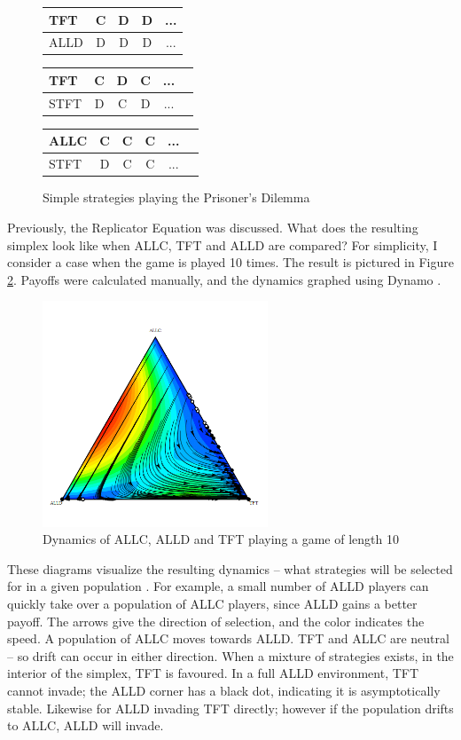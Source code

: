 \documentclass[a4paper,11pt,bcshonoursthesis,singlespace,oneside,thesisdraft,pdflatex]{cssethesis}
\begin{document}
\begin{figure}[h]
\centering
\captionsetup{justification=centering}
\begin{tabular}{|l|c|c|c|c|}
\hline
TFT & C & D & D&...\\
\hline
ALLD & D & D &D&...\\
\hline
\end{tabular}\hfill
\begin{tabular}{|l|c|c|c|c|c|}
\hline
TFT & C & D&C&...\\
\hline
STFT & D & C&D&...\\
\hline
\end{tabular}\hfill
\begin{tabular}{|l|c|c|c|c|c|}
\hline
ALLC & C & C&C&...\\
\hline
STFT & D & C&C&...\\
\hline
\end{tabular}\hfill
\caption{Simple strategies playing the Prisoner's Dilemma}
\label{table:reciprocity}
\end{figure}

Previously, the Replicator Equation was discussed. 
What does the resulting simplex look like when ALLC, TFT and ALLD are compared? 
For simplicity, I consider a case when the game is played 10 times. 
The result is pictured in Figure \ref{fig:allcalldtft}. 
Payoffs were calculated manually, and the dynamics graphed using Dynamo \citep{dynamo}.

\begin{figure}[h!]
\center
\includegraphics[width=0.6\textwidth]{allcalldtft}
\caption{Dynamics of ALLC, ALLD and TFT playing a game of length 10}
\label{fig:allcalldtft}
\end{figure}
 
These diagrams visualize the resulting dynamics -- what strategies will be selected for in a given population \citep{imhof:PNAS:2005}. 
For example, a small number of ALLD players can quickly take over a population of ALLC players, since ALLD gains a better payoff. The arrows give the direction of selection, and the color indicates the speed. A population of ALLC moves towards ALLD. 
TFT and ALLC are neutral -- so drift can occur in either direction. 
When a mixture of strategies exists, in the interior of the simplex, TFT is favoured. 
In a full ALLD environment, TFT cannot invade; the ALLD corner has a black dot, indicating it is asymptotically stable. 
Likewise for ALLD invading TFT directly; however if the population drifts to ALLC, ALLD will invade. 
\end{document}
